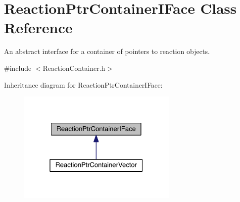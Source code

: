 \hypertarget{classReactionPtrContainerIFace}{\section{Reaction\+Ptr\+Container\+I\+Face Class Reference}
\label{classReactionPtrContainerIFace}
}


An abstract interface for a container of pointers to reaction objects.  




{\ttfamily \#include $<$Reaction\+Container.\+h$>$}



Inheritance diagram for Reaction\+Ptr\+Container\+I\+Face\+:\nopagebreak
\begin{figure}[H]
\begin{center}
\leavevmode
\includegraphics[width=220pt]{classReactionPtrContainerIFace__inherit__graph}
\end{center}
\end{figure}
